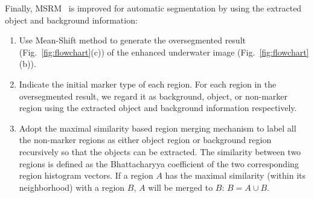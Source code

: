 \documentclass{article}
\begin{document}
Finally, MSRM~\cite{ning2010interactive} is improved for automatic segmentation by using the extracted object and background information: 
\begin{enumerate}
\item Use Mean-Shift method to generate the oversegmented result (Fig.~\ref{fig:flowchart}(c)) of the enhanced underwater image (Fig.~\ref{fig:flowchart}(b)). 
\item Indicate the initial marker type of each region. For each region in the oversegmented result, we regard it as background, object, or non-marker region using the extracted object and background information respectively.
\item Adopt the maximal similarity based region merging mechanism to label all the non-marker regions as either object region or background region recursively so that the objects can be extracted. The similarity between two regions is defined as the Bhattacharyya coefficient of the two corresponding region histogram vectors. If a region $A$ has the maximal similarity (within its neighborhood) with a region $B$, $A$ will be merged to $B$: $B=A\cup B$.

\end{enumerate}
\end{document}
